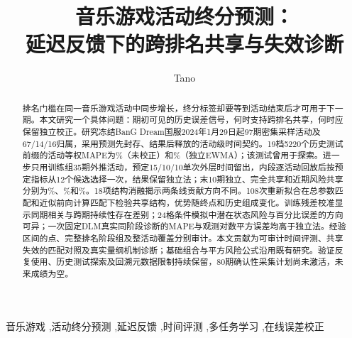 \documentclass[preprint,12pt]{elsarticle}
\begin{document}
\begin{frontmatter}
\title{音乐游戏活动终分预测：\\延迟反馈下的跨排名共享与失效诊断}
\author{Tano}
\begin{abstract}
排名门槛在同一音乐游戏活动中同步增长，终分标签却要等到活动结束后才可用于下一期。本文研究一个具体问题：期初可见的历史误差信号，何时支持跨排名共享，何时应保留独立校正。研究冻结BanG Dream国服2024年1月29日起97期密集采样活动及67/14/16归属，采用预测先封存、结果后释放的活动级时间契约。19档5220个历史测试前缀的活动等权MAPE为\BaseTest\%（未校正）和\EwmaTest\%（独立EWMA）；该测试曾用于探索。进一步只用训练组35期外推活动，预定15/10/10单次外层时间留出，内段逐活动回放后按预定指标从12个候选选择一次，结果保留独立法；末10期独立、完全共享和近期风险共享分别为\RTIndependent\%、\RTPool\%和\RTRisk\%。18项结构消融揭示两条线贡献方向不同。108次重新拟合在总参数匹配和近似前向计算匹配下检验共享结构，优势随终点和历史组成变化。训练残差校准显示同期相关与跨期持续性存在差别；24格条件模拟中潜在状态风险与百分比误差的方向可异；一次固定DLM真实同阶段诊断的MAPE与观测对数平方误差均高于独立法。经验区间的点、完整排名阶段组及整活动覆盖分别审计。本文贡献为可审计时间评测、共享失效的匹配对照及真实量纲机制诊断；基础组合与平方风险公式沿用既有研究。验证反复使用、历史测试探索及回溯元数据限制持续保留，80期确认性采集计划尚未激活，未来成绩为空。
\end{abstract}
\begin{keyword}
音乐游戏 \sep 活动终分预测 \sep 延迟反馈 \sep 时间评测 \sep 多任务学习 \sep 在线误差校正
\end{keyword}
\end{frontmatter}
\end{document}
